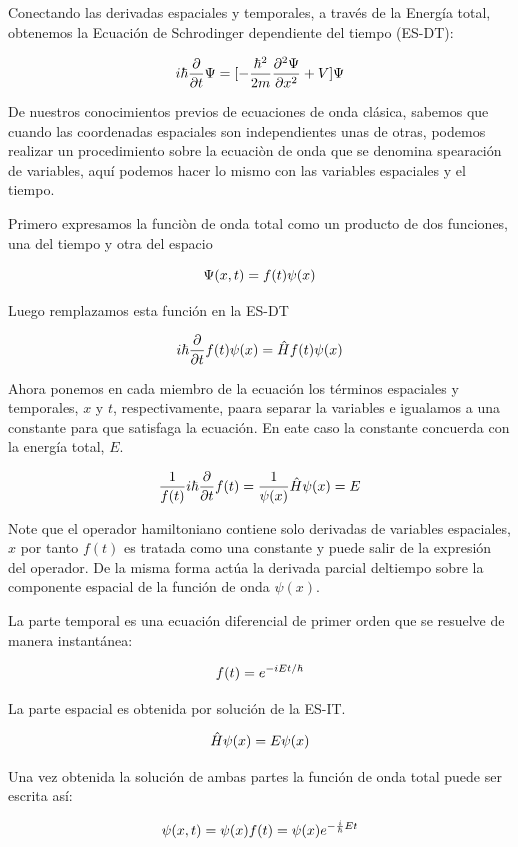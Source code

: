 \documentclass[11pt]{article}
\makeatletter
\newcommand{\boxspacing}{\kern\kvtcb@left@rule\kern\kvtcb@boxsep}
\newcommand{\prompt}[4]{
        \ttfamily\llap{{\color{#2}[#3]:\hspace{3pt}#4}}\vspace{-\baselineskip}
    }
\makeatother
\begin{document}
Conectando las derivadas espaciales y temporales, a través de la Energía
total, obtenemos la Ecuación de Schrodinger dependiente del tiempo
(ES-DT):

\[\large i\hbar \frac{\partial }{\partial t} \Psi= [-\frac{\hbar^2}{2m}\frac{\partial^2 \Psi}{\partial x^2}+V]\Psi\]

De nuestros conocimientos previos de ecuaciones de onda clásica, sabemos
que cuando las coordenadas espaciales son independientes unas de otras,
podemos realizar un procedimiento sobre la ecuaciòn de onda que se
denomina spearación de variables, aquí podemos hacer lo mismo con las
variables espaciales y el tiempo.

Primero expresamos la funciòn de onda total como un producto de dos
funciones, una del tiempo y otra del espacio

\[\large \Psi(x,t)=f(t)\psi(x) \]

Luego remplazamos esta función en la ES-DT

\[i\large \hbar \frac{\partial }{\partial t} f(t)\psi(x) =\hat{H}f(t)\psi(x)\]

Ahora ponemos en cada miembro de la ecuación los términos espaciales y
temporales, \(x\) y \(t\), respectivamente, paara separar la variables e
igualamos a una constante para que satisfaga la ecuación. En eate caso
la constante concuerda con la energía total, \(E\).

\[\large \frac{1}{f(t)}i\hbar \frac{\partial }{\partial t} f(t)=\frac{1}{\psi(x) }\hat{H}\psi(x)=E\]

Note que el operador hamiltoniano contiene solo derivadas de variables
espaciales, \(x\) por tanto \(f(t)\) es tratada como una constante y
puede salir de la expresión del operador. De la misma forma actúa la
derivada parcial deltiempo sobre la componente espacial de la función de
onda \(\psi(x)\).

La parte temporal es una ecuación diferencial de primer orden que se
resuelve de manera instantánea:

\[\large f(t)=e^{-iEt/\hbar} \]

La parte espacial es obtenida por solución de la ES-IT.

\[\large \hat{H}\psi(x)=E\psi(x)\]

Una vez obtenida la solución de ambas partes la función de onda total
puede ser escrita así:

\[\large \psi(x,t)=\psi(x)f(t)=\psi(x) e^{-\frac{i}{\hbar}Et}\]

    \begin{tcolorbox}[breakable, size=fbox, boxrule=1pt, pad at break*=1mm,colback=cellbackground, colframe=cellborder]
\prompt{In}{incolor}{ }{\boxspacing}
\begin{Verbatim}[commandchars=\\\{\}]

\end{Verbatim}
\end{tcolorbox}


    
    
    
\end{document}
